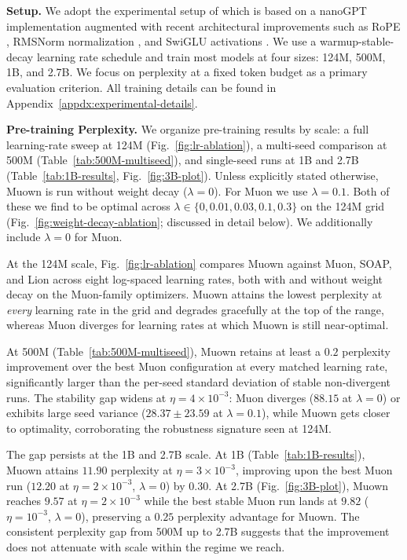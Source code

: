 \documentclass{article}
\newcommand{\algname}{Muown}
\begin{document}
\textbf{Setup.} We adopt the experimental setup of \cite{ajroldi2024plainlm} which is based on a nanoGPT \citep{karpathy2022nanogpt} implementation augmented with recent architectural improvements such as RoPE \citep{su_rope}, RMSNorm normalization \citep{zhang_rmsnorm}, and SwiGLU activations \citep{shazeer_glu_2020}. We use a warmup-stable-decay learning rate schedule \citep{hu_minicpm_2024} and train most models at four sizes: 124M, 500M, 1B, and 2.7B. We focus on perplexity at a fixed token budget as a primary evaluation criterion. All training details can be found in Appendix~\ref{appdx:experimental-details}.



\textbf{Pre-training Perplexity.} We organize pre-training results by scale: a full learning-rate sweep at 124M (Fig.~\ref{fig:lr-ablation}), a multi-seed comparison at 500M (Table~\ref{tab:500M-multiseed}), and single-seed runs at 1B and 2.7B (Table~\ref{tab:1B-results}, Fig.~\ref{fig:3B-plot}). Unless explicitly stated otherwise,
\algname{} is run without weight decay ($\lambda=0$). For Muon we use $\lambda=0.1$. Both of these we find to be optimal across $\lambda \in \{0, 0.01, 0.03, 0.1, 0.3\}$ on the 124M grid (Fig.~\ref{fig:weight-decay-ablation}; discussed in detail below). We additionally include $\lambda = 0$ for Muon. 

At the 124M scale, Fig.~\ref{fig:lr-ablation} compares \algname{} against Muon, SOAP, and Lion across eight log-spaced learning rates, both with and without weight decay on the Muon-family optimizers. \algname{} attains the lowest perplexity at \emph{every} learning rate in the grid and degrades gracefully at the top of the range, whereas Muon diverges for learning rates at which \algname{} is still near-optimal.

At 500M (Table~\ref{tab:500M-multiseed}), \algname{} retains at least a $0.2$ perplexity improvement over the best Muon configuration at every matched learning rate, significantly larger than the per-seed standard deviation of stable non-divergent runs. The stability gap widens at $\eta=4\times 10^{-3}$: Muon diverges ($88.15$ at $\lambda=0$) or exhibits large seed variance ($28.37 \pm 23.59$ at $\lambda=0.1$), while \algname{} gets closer to optimality, corroborating the robustness signature seen at 124M.

The gap persists at the 1B and 2.7B scale. At 1B (Table~\ref{tab:1B-results}), \algname{} attains $11.90$ perplexity at $\eta=3\times 10^{-3}$, improving upon the best Muon run ($12.20$ at $\eta=2\times 10^{-3}$, $\lambda=0$) by $0.30$. At 2.7B (Fig.~\ref{fig:3B-plot}), \algname{} reaches $9.57$ at $\eta=2\times 10^{-3}$ while the best stable Muon run lands at $9.82$ ($\eta=10^{-3}$, $\lambda=0$), preserving a $0.25$ perplexity advantage for \algname{}. The consistent perplexity gap from 500M up to 2.7B suggests that the improvement does not attenuate with scale within the regime we reach.
\end{document}
